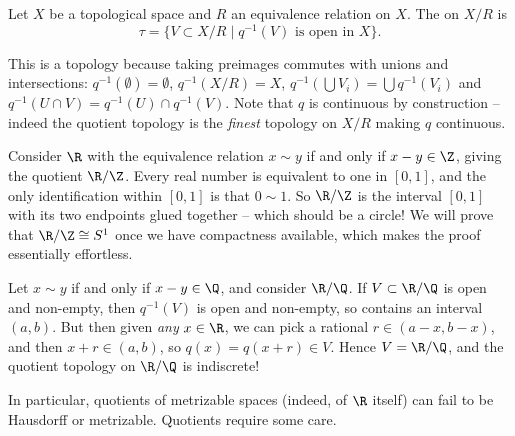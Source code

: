 \begin{definition}
    Let $X$ be a topological space and $R$ an equivalence relation on $X$. The  on $X/R$ is
    $$
    \tau = \{V \subset X/R \mid q^{-1}(V) \text{ is open in } X\}.
    $$
\end{definition}

This is a topology because taking preimages commutes with unions and intersections: $q^{-1}(\emptyset) = \emptyset$, $q^{-1}(X/R) = X$, $q^{-1}(\bigcup V_i) = \bigcup q^{-1}(V_i)$ and $q^{-1}(U \cap V) = q^{-1}(U) \cap q^{-1}(V)$. Note that $q$ is continuous by construction -- indeed the quotient topology is the \emph{finest} topology on $X/R$ making $q$ continuous.

\begin{example}
    Consider $\R$ with the equivalence relation $x \sim y$ if and only if $x - y \in \Z$, giving the quotient $\R / \Z$. Every real number is equivalent to one in $[0, 1]$, and the only identification within $[0, 1]$ is that $0 \sim 1$. So $\R/\Z$ is the interval $[0, 1]$ with its two endpoints glued together -- which should be a circle! We will prove that $\R/\Z \cong S^1$ once we have compactness available, which makes the proof essentially effortless.
\end{example}

\begin{example}
    Let $x \sim y$ if and only if $x - y \in \Q$, and consider $\R / \Q$. If $V \subset \R/\Q$ is open and non-empty, then $q^{-1}(V)$ is open and non-empty, so contains an interval $(a, b)$. But then given \emph{any} $x \in \R$, we can pick a rational $r \in (a - x, b - x)$, and then $x + r \in (a, b)$, so $q(x) = q(x + r) \in V$. Hence $V = \R/\Q$, and the quotient topology on $\R/\Q$ is indiscrete!

    In particular, quotients of metrizable spaces (indeed, of $\R$ itself) can fail to be Hausdorff or metrizable. Quotients require some care.
\end{example}

